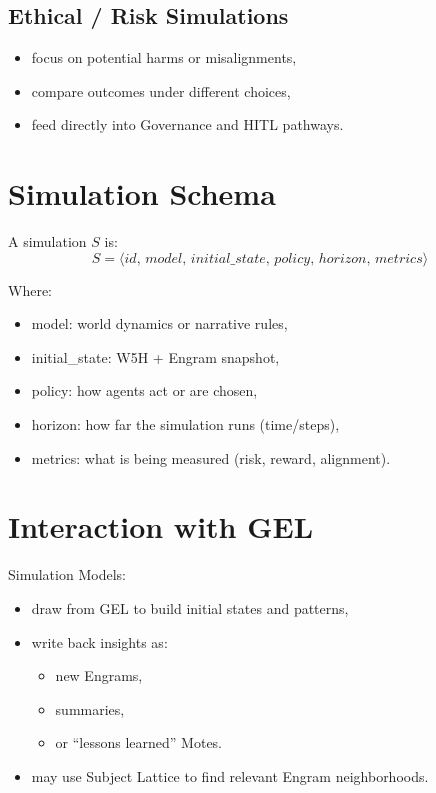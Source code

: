 \subsection{Ethical / Risk Simulations}

\begin{itemize}
    \item focus on potential harms or misalignments,
    \item compare outcomes under different choices,
    \item feed directly into Governance and HITL pathways.
\end{itemize}

\section{Simulation Schema}

A simulation $S$ is:
\[
S = \langle id,\, model,\, initial\_state,\, policy,\, horizon,\, metrics \rangle
\]

Where:
\begin{itemize}
    \item model: world dynamics or narrative rules,
    \item initial\_state: W5H + Engram snapshot,
    \item policy: how agents act or are chosen,
    \item horizon: how far the simulation runs (time/steps),
    \item metrics: what is being measured (risk, reward, alignment).
\end{itemize}

\section{Interaction with GEL}

Simulation Models:
\begin{itemize}
    \item draw from GEL to build initial states and patterns,
    \item write back insights as:
          \begin{itemize}
              \item new Engrams,
              \item summaries,
              \item or ``lessons learned'' Motes.
          \end{itemize}
    \item may use Subject Lattice to find relevant Engram neighborhoods.
\end{itemize}

